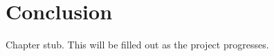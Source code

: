 \chapter{Conclusion}\label{ch:conclusion}

Chapter stub. This will be filled out as the project progresses.









